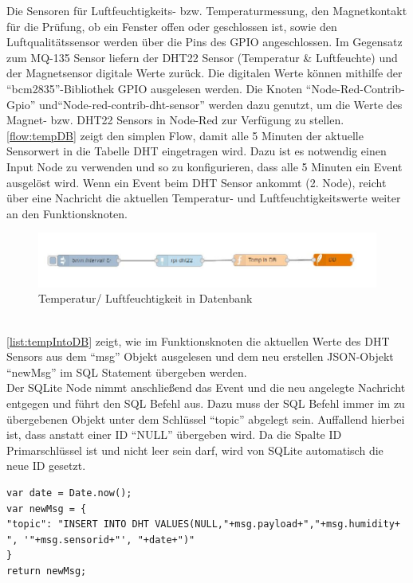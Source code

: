 Die Sensoren für Luftfeuchtigkeits- bzw. Temperaturmessung, den Magnetkontakt für die Prüfung, ob ein Fenster offen oder geschlossen ist, sowie den Luftqualitätssensor werden über die Pins des \ac{GPIO} angeschlossen. Im Gegensatz zum MQ-135 Sensor liefern der DHT22 Sensor (Temperatur \& Luftfeuchte) und der Magnetsensor digitale Werte zurück. Die digitalen Werte können mithilfe der \enquote{bcm2835}-Bibliothek \ac{GPIO} ausgelesen werden\cite{bcm:Bcm}. Die Knoten \enquote{Node-Red-Contrib-Gpio}\cite{node:GPIO} und\enquote{Node-red-contrib-dht-sensor}\cite{node:DHT22} werden dazu genutzt, um die Werte des Magnet- bzw. DHT22 Sensors in Node-Red zur Verfügung zu stellen. 
\\
\autoref{flow:tempDB} zeigt den simplen Flow, damit alle 5 Minuten der aktuelle Sensorwert in die Tabelle DHT eingetragen wird. Dazu ist es notwendig einen Input Node zu verwenden und so zu konfigurieren, dass alle 5 Minuten ein Event ausgelöst wird. Wenn ein Event beim DHT Sensor ankommt (2. Node), reicht über eine Nachricht die aktuellen Temperatur- und Luftfeuchtigkeitswerte weiter an den Funktionsknoten.
\begin{figure}[h]
	\centering
	\includegraphics[scale=0.7]{images/tempIntoDB}
	\caption{Temperatur/ Luftfeuchtigkeit in Datenbank}
	\label{flow:tempDB}
\end{figure}
\\\autoref{list:tempIntoDB} zeigt, wie im Funktionsknoten die aktuellen Werte des DHT Sensors aus dem \enquote{msg} Objekt ausgelesen und dem neu erstellen \ac{JSON}-Objekt \enquote{newMsg} im \ac{SQL} Statement übergeben werden. \\Der SQLite Node nimmt anschließend das Event und die neu angelegte Nachricht entgegen und führt den \ac{SQL} Befehl  aus. Dazu muss der \ac{SQL} Befehl immer im zu übergebenen Objekt unter dem Schlüssel \enquote{topic} abgelegt sein. Auffallend hierbei ist, dass anstatt einer ID \enquote{NULL} übergeben wird. Da die Spalte ID Primarschlüssel ist und nicht leer sein darf, wird von SQLite automatisch die neue ID gesetzt.
\begin{lstlisting}[label=list:tempIntoDB, caption={Neuer Eintrag in Tabelle DHT}]
var date = Date.now();
var newMsg = {
"topic": "INSERT INTO DHT VALUES(NULL,"+msg.payload+","+msg.humidity+ ", '"+msg.sensorid+"', "+date+")"
}
return newMsg;
\end{lstlisting}
